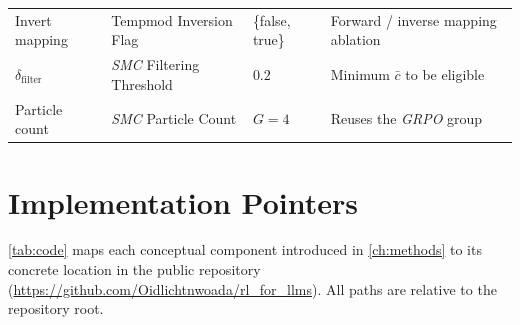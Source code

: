 \documentclass[a4paper,oneside,10pt,english]{scrbook}
\DeclareRobustCommand{\acfit}[1]{\textit{\ac{#1}}}
\begin{document}
\begin{landscape}
\begin{longtable}{l l >{\raggedright\arraybackslash}p{4.3cm} >{\raggedright\arraybackslash}p{8.3cm}}
		Invert mapping                          & Tempmod Inversion Flag                  & \{false, true\}                                                                        & Forward / inverse mapping ablation                                                           \\
		$\delta_{\mathrm{filter}}$              & \acfit{SMC} Filtering Threshold         & $0.2$                                                                                  & Minimum $\bar c$ to be eligible                                                              \\
		Particle count                          & \acfit{SMC} Particle Count              & $G=4$                                                                                  & Reuses the \acfit{GRPO} group                                                                \\
	\end{longtable}
\end{landscape}

\cleardoubleoddpage
\chapter{Implementation Pointers}
\label{app:code}

\autoref{tab:code} maps each conceptual component introduced in \autoref{ch:methods} to its concrete location in the public repository (\url{https://github.com/Oidlichtnwoada/rl_for_llms}). All paths are relative to the repository root.
\end{document}
